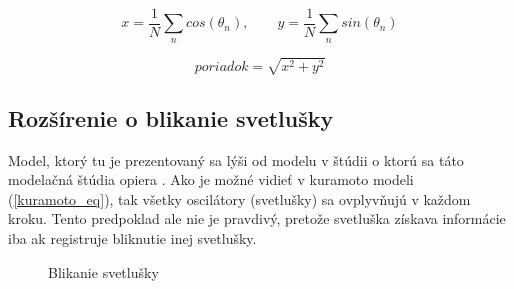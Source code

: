 \documentclass[a4paper, 11pt]{article}
\begin{document}
\begin{equation} \label{order_eq}
    x =  \frac{1}{N} \sum_n cos(\theta_n), \hspace{2em}  y =  \frac{1}{N} \sum_n sin(\theta_n) 
\end{equation}

\begin{equation} \label{vectorlength_eq}
    poriadok = \sqrt{x^2 + y^2} 
\end{equation}











\subsection{Rozšírenie o blikanie svetlušky} \label{Ovplivnovanie}
Model, ktorý tu je prezentovaný sa lýši od modelu v štúdii o ktorú sa táto modelačná štúdia opiera \cite{Svetlusky}. Ako je možné vidieť v kuramoto modeli (\ref{kuramoto_eq}), tak všetky oscilátory (svetlušky) sa ovplyvňujú v každom kroku. Tento predpoklad ale nie je pravdivý, pretože svetluška získava informácie iba ak registruje bliknutie inej svetlušky.

\begin{figure}[h]
    \vspace*{-0.2cm}
    \centering
\caption{Blikanie svetlušky\label{pilka}}
\end{figure}
\end{document}
